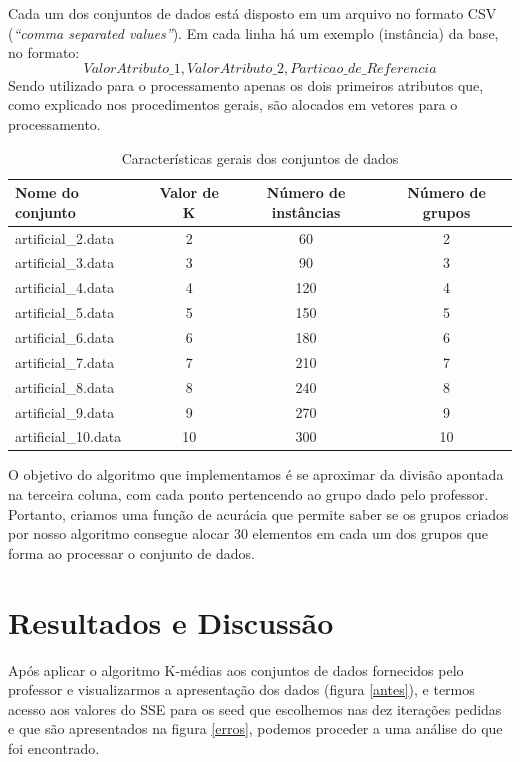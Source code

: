 \documentclass[12pt, a4paper]{article}
\begin{document}
Cada um dos conjuntos de dados está disposto em um arquivo no formato CSV (\emph{``comma separated values''}). Em cada linha há um exemplo (instância) da base, no formato: $$Valor Atributo\_1, Valor Atributo\_2, Particao\_de\_Referencia$$ Sendo utilizado para o processamento apenas os dois primeiros atributos que, como explicado nos procedimentos gerais, são alocados em vetores para o processamento.

\begin{table}[!ht]
\centering
\caption{Características gerais dos conjuntos de dados}
\label{conjDados}
	\begin{tabular}{|l|c|c|c|}
	\hline
	Nome do conjunto & Valor de K & Número de instâncias & Número de grupos \\
	\hline
		artificial\_2.data & 2 & 60 & 2 \\
	\hline
		artificial\_3.data & 3 & 90 & 3 \\
	\hline
		artificial\_4.data & 4 & 120 & 4 \\
	\hline
		artificial\_5.data & 5 & 150 & 5 \\
	\hline
		artificial\_6.data & 6 & 180 & 6 \\
	\hline
		artificial\_7.data & 7 & 210 & 7 \\
	\hline
		artificial\_8.data & 8 & 240 & 8 \\
	\hline
		artificial\_9.data & 9 & 270 & 9 \\
	\hline
		artificial\_10.data & 10 & 300 & 10 \\
	\hline
	\end{tabular}
\end{table}

O objetivo do algoritmo que implementamos é se aproximar da divisão apontada na terceira coluna, com cada ponto pertencendo ao grupo dado pelo professor. Portanto, criamos uma função de acurácia que permite saber se os grupos criados por nosso algoritmo consegue alocar 30 elementos em cada um dos grupos que forma ao processar o conjunto de dados.

\section{Resultados e Discussão}
\label{discussao}
Após aplicar o algoritmo K-médias aos conjuntos de dados fornecidos pelo professor e visualizarmos a apresentação dos dados (figura \ref{antes}), e termos acesso aos valores do SSE para os seed que escolhemos nas dez iterações pedidas e que são apresentados na figura \ref{erros}, podemos proceder a uma análise do que foi encontrado.
\end{document}
